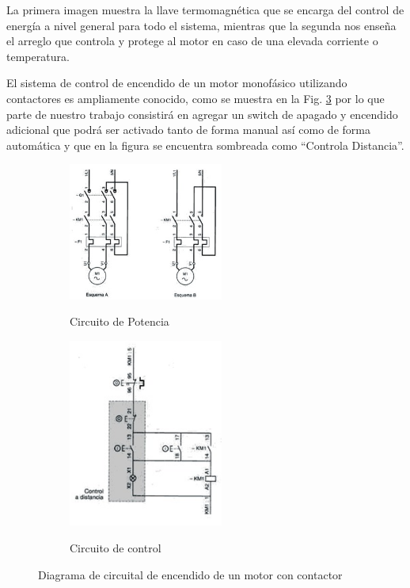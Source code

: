 \documentclass[main_conf.tex]{subfiles}
\begin{document}
La primera imagen muestra la llave termomagnética que se encarga del
control de energía a nivel general para todo el sistema, mientras que la 
segunda nos enseña el arreglo que controla y protege al motor en caso de 
una elevada corriente o temperatura.

El sistema de control de encendido de un motor monofásico utilizando
contactores es ampliamente conocido, como se muestra en la Fig. 
\ref{diag_control_on_off_motor} por lo que parte de nuestro trabajo 
consistirá en agregar un switch de apagado y encendido adicional que podrá 
ser activado tanto de forma manual así como de forma automática y que en
la figura se encuentra sombreada como “Controla Distancia”.

\begin{figure}[t]
  \centering
  \begin{subfigure}[b]{0.5\textwidth}
    \centering
    \includegraphics[width=2.0in]{../img/Circuito_de_potencia.png}
    \label{Circuito_de_potencia}
    \caption{Circuito de Potencia}
  \end{subfigure}
     
  \begin{subfigure}[b]{0.5\textwidth}
    \centering
    \includegraphics[width=2.0in]{../img/Circuito_de_control.png}
    \label{Circuito_de_control}
    \caption{Circuito de control}
  \end{subfigure}

  \caption{Diagrama de circuital de encendido de un motor con contactor}
  \label{diag_control_on_off_motor}
\end{figure}
\end{document}
